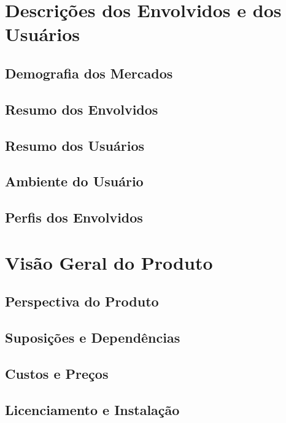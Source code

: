 \section{Descrições dos Envolvidos e dos Usuários}

\subsection{Demografia dos Mercados}

\subsection{Resumo dos Envolvidos}

\subsection{Resumo dos Usuários}

\subsection{Ambiente do Usuário}

\subsection{Perfis dos Envolvidos}

\section{Visão Geral do Produto}

\subsection{Perspectiva do Produto}

\subsection{Suposições e Dependências}

\subsection{Custos e Preços}

\subsection{Licenciamento e Instalação}

